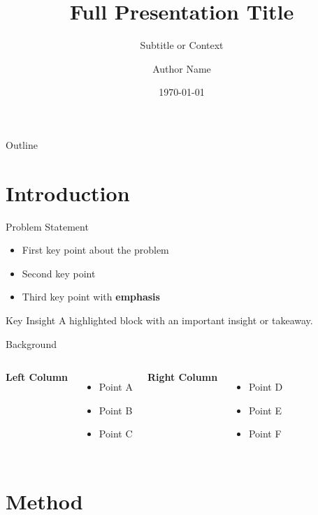 \documentclass[aspectratio=169]{beamer}
\title[Short Title]{Full Presentation Title}
\subtitle{Subtitle or Context}
\author{Author Name}
\institute{Organization or University}
\date{\today}
\begin{document}
\begin{frame}
\titlepage
\end{frame}

\begin{frame}{Outline}
\tableofcontents
\end{frame}

\section{Introduction}

\begin{frame}{Problem Statement}
    \begin{itemize}
        \item First key point about the problem
        \item Second key point
        \item Third key point with \textcolor{accent}{\textbf{emphasis}}
    \end{itemize}

    \vspace{1em}
    \begin{block}{Key Insight}
        A highlighted block with an important insight or takeaway.
    \end{block}
\end{frame}

\begin{frame}{Background}
    \begin{columns}[T]
        \textbf{Left Column}
        \begin{itemize}
            \item Point A
            \item Point B
            \item Point C
        \end{itemize}

        \textbf{Right Column}
        \begin{itemize}
            \item Point D
            \item Point E
            \item Point F
        \end{itemize}
    \end{columns}
\end{frame}

\section{Method}
\end{document}
